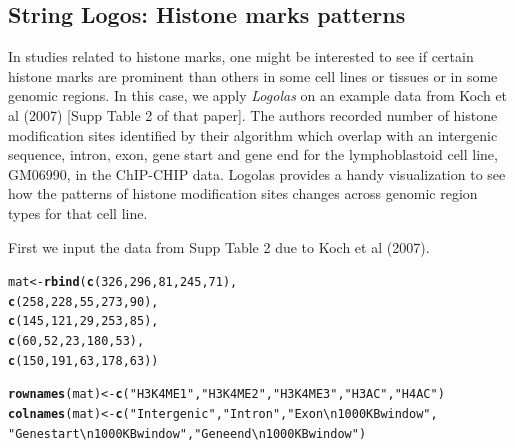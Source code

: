 \documentclass[12pt]{article}\usepackage[]{graphicx}\usepackage[usenames,dvipsnames]{color}
\makeatletter
\newcommand{\hlnum}[1]{\textcolor[rgb]{0.686,0.059,0.569}{#1}}%
\newcommand{\hlstr}[1]{\textcolor[rgb]{0.192,0.494,0.8}{#1}}%
\newcommand{\hlstd}[1]{\textcolor[rgb]{0.345,0.345,0.345}{#1}}%
\newcommand{\hlkwb}[1]{\textcolor[rgb]{0.69,0.353,0.396}{#1}}%
\newcommand{\hlkwd}[1]{\textcolor[rgb]{0.737,0.353,0.396}{\textbf{#1}}}%
\newenvironment{kframe}{%
 \def\at@end@of@kframe{}%
 \ifinner\ifhmode%
  \def\at@end@of@kframe{\end{minipage}}%
  \begin{minipage}{\columnwidth}%
 \fi\fi%
 \def\FrameCommand##1{\hskip\@totalleftmargin \hskip-\fboxsep
 \colorbox{shadecolor}{##1}\hskip-\fboxsep
     \hskip-\linewidth \hskip-\@totalleftmargin \hskip\columnwidth}%
 \MakeFramed {\advance\hsize-\width
   \@totalleftmargin\z@ \linewidth\hsize
   \@setminipage}}%
 {\par\unskip\endMakeFramed%
 \at@end@of@kframe}
\newenvironment{knitrout}{}{} %
\newcommand{\Logolas}{\textit{Logolas}}
\makeatother
\begin{document}
\clearpage

\subsection{String Logos:  Histone marks patterns}

In studies related to histone marks, one might be interested to see if certain histone marks are prominent than others in some cell lines or tissues or in some genomic regions. In this case, we apply \Logolas{} on an example data from Koch et al (2007) [Supp Table 2 of that paper]. The authors recorded number of histone modification sites identified by their algorithm which overlap with an intergenic sequence, intron, exon, gene start and gene end for the lymphoblastoid cell line, GM06990, in the ChIP-CHIP data. Logolas provides a handy visualization to see how the patterns of histone modification sites changes across genomic region types for that cell line.

First we input the data from Supp Table 2 due to Koch et al (2007).

\begin{knitrout}
\color{fgcolor}\begin{kframe}
\begin{alltt}
\hlstd{mat} \hlkwb{<-} \hlkwd{rbind}\hlstd{(}\hlkwd{c}\hlstd{(}\hlnum{326}\hlstd{,} \hlnum{296}\hlstd{,} \hlnum{81}\hlstd{,} \hlnum{245}\hlstd{,} \hlnum{71}\hlstd{),}
             \hlkwd{c}\hlstd{(}\hlnum{258}\hlstd{,} \hlnum{228}\hlstd{,} \hlnum{55}\hlstd{,} \hlnum{273}\hlstd{,} \hlnum{90}\hlstd{),}
             \hlkwd{c}\hlstd{(}\hlnum{145}\hlstd{,} \hlnum{121}\hlstd{,} \hlnum{29}\hlstd{,} \hlnum{253}\hlstd{,} \hlnum{85}\hlstd{),}
             \hlkwd{c}\hlstd{(}\hlnum{60}\hlstd{,} \hlnum{52}\hlstd{,} \hlnum{23}\hlstd{,} \hlnum{180}\hlstd{,} \hlnum{53}\hlstd{),}
             \hlkwd{c}\hlstd{(}\hlnum{150}\hlstd{,} \hlnum{191}\hlstd{,} \hlnum{63}\hlstd{,} \hlnum{178}\hlstd{,} \hlnum{63}\hlstd{))}

\hlkwd{rownames}\hlstd{(mat)} \hlkwb{<-} \hlkwd{c}\hlstd{(}\hlstr{"H3K4ME1"}\hlstd{,} \hlstr{"H3K4ME2"}\hlstd{,} \hlstr{"H3K4ME3"}\hlstd{,} \hlstr{"H3AC"}\hlstd{,} \hlstr{"H4AC"}\hlstd{)}
\hlkwd{colnames}\hlstd{(mat)} \hlkwb{<-} \hlkwd{c}\hlstd{(}\hlstr{"Intergenic"}\hlstd{,}\hlstr{"Intron"}\hlstd{,}\hlstr{"Exon \textbackslash{}n 1000 KB window"}\hlstd{,}
                   \hlstr{"Gene start \textbackslash{}n 1000 KB window"}\hlstd{,}\hlstr{"Gene end \textbackslash{}n 1000 KB window"}\hlstd{)}
\end{alltt}
\end{kframe}
\end{knitrout}
\end{document}
